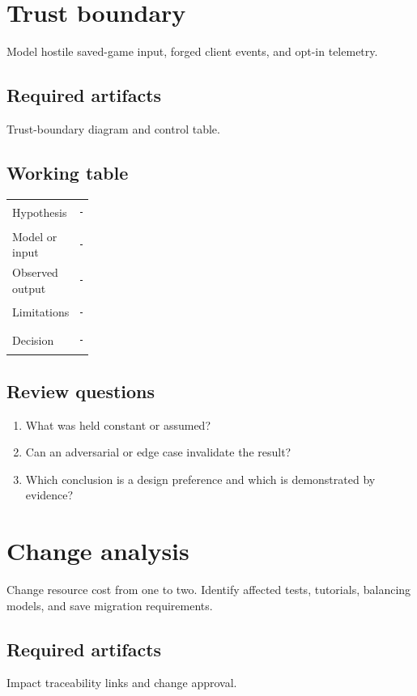 \documentclass[11pt]{article}
\begin{document}
\section{Trust boundary}
Model hostile saved-game input, forged client events, and opt-in telemetry.


\subsection{Required artifacts}
Trust-boundary diagram and control table.


\subsection{Working table}
\begin{tabularx}{\linewidth}{@{}p{0.20\linewidth}X@{}}\toprule
Hypothesis & \rule{0.90\linewidth}{0.4pt}\\[0.35cm]
Model or input & \rule{0.90\linewidth}{0.4pt}\\[0.35cm]
Observed output & \rule{0.90\linewidth}{0.4pt}\\[0.35cm]
Limitations & \rule{0.90\linewidth}{0.4pt}\\[0.35cm]
Decision & \rule{0.90\linewidth}{0.4pt}\\\bottomrule\end{tabularx}

\subsection{Review questions}
\begin{enumerate}
\item What was held constant or assumed?
\item Can an adversarial or edge case invalidate the result?
\item Which conclusion is a design preference and which is demonstrated by evidence?
\end{enumerate}

\section{Change analysis}
Change resource cost from one to two. Identify affected tests, tutorials, balancing models, and save migration requirements.


\subsection{Required artifacts}
Impact traceability links and change approval.
\end{document}
